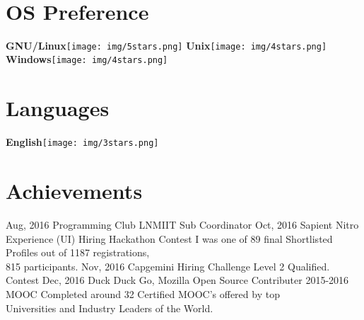 \documentclass[]{friggeri-cv}
\begin{document}
\begin{aside}
~
~
~
  \section{OS Preference}
    \textbf{GNU/Linux}\texttt{[image: img/5stars.png]}
    \textbf{Unix}\texttt{[image: img/4stars.png]}
    \textbf{Windows}\texttt{[image: img/4stars.png]}
    ~
    ~
  \section{Languages}
    \textbf{English}\texttt{[image: img/3stars.png]}
    ~
\end{aside}


\section{Achievements}
\begin{entrylist}
\entry
    {Aug, 2016}
    {Programming Club}
    {LNMIIT}
    {Sub Coordinator}
  \entry
    {Oct, 2016}
    {Sapient Nitro Experience (UI) Hiring Hackathon}
    {Contest}
    {I was one of  89 final Shortlisted Profiles  out of  1187 registrations, \\ 815 participants.}
    \entry
    {Nov, 2016}
    {Capgemini Hiring Challenge Level 2 Qualified.}
    {Contest}
    {}
     \entry
    {Dec, 2016}
    {Duck Duck Go, Mozilla}
    {Open Source Contributer}
    {}
     \entry
    {2015-2016}
    {MOOC}
    {}
    {Completed around 32 Certified MOOC's offered by top\\ Universities 
      and Industry Leaders of the World.}
    
\end{entrylist}
\end{document}
